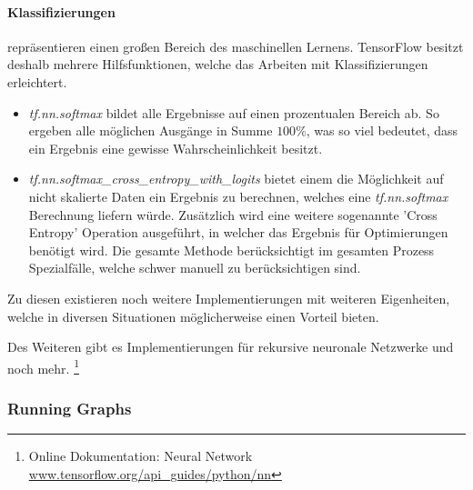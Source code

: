 \paragraph{Klassifizierungen} repräsentieren einen großen Bereich des maschinellen Lernens. 
TensorFlow besitzt deshalb mehrere Hilfsfunktionen, welche das Arbeiten mit Klassifizierungen erleichtert. 
\begin{itemize}
	\item \textit{tf.nn.softmax} bildet alle Ergebnisse auf einen prozentualen Bereich ab. 
	So ergeben alle möglichen Ausgänge in Summe $100\%$, was so viel bedeutet, dass ein Ergebnis eine gewisse Wahrscheinlichkeit besitzt. 
	\item \textit{tf.nn.softmax\_cross\_entropy\_with\_logits} bietet einem die Möglichkeit auf nicht skalierte Daten ein Ergebnis zu berechnen, welches eine \textit{tf.nn.softmax} Berechnung liefern würde. 
	Zusätzlich wird eine weitere sogenannte 'Cross Entropy' Operation ausgeführt, in welcher das Ergebnis für Optimierungen benötigt wird. 
	Die gesamte Methode berücksichtigt im gesamten Prozess Spezialfälle, welche schwer manuell zu berücksichtigen sind. 
\end{itemize}
\phantom \newline

\noindent
Zu diesen existieren noch weitere Implementierungen mit weiteren Eigenheiten, welche in diversen Situationen möglicherweise einen Vorteil bieten. 
\phantom \newline

\noindent
Des Weiteren gibt es Implementierungen für rekursive neuronale Netzwerke und noch mehr. 
\footnote{Online Dokumentation: Neural Network \url{www.tensorflow.org/api_guides/python/nn}}

\subsubsection{Running Graphs}

